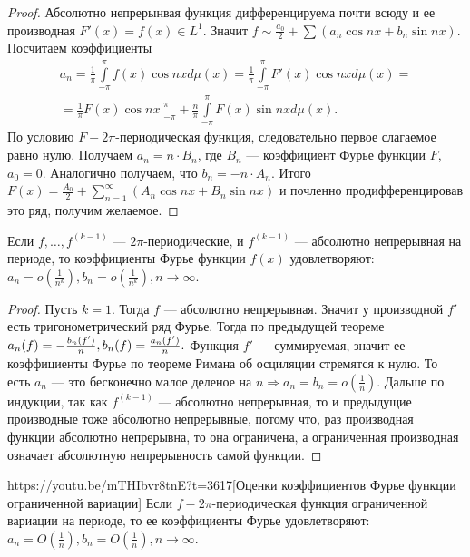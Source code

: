 \begin{proof}
	Абсолютно непрерынвая функция дифференцируема почти всюду и ее производная $F'(x)=f(x)\in L^1$. Значит $f\sim\frac{a_0}{2}+\sum\limits(a_n\cos nx+b_n\sin nx)$. Посчитаем коэффициенты 
	\begin{multline*}
		a_n=\frac{1}{\pi}\int\limits_{-\pi}^\pi f(x)\cos nx d\mu(x)=\frac{1}{\pi}\int\limits_{-\pi}^\pi F'(x)\cos nxd\mu(x) =\\=\frac{1}{\pi}F(x)\cos nx|_{-\pi}^\pi+\frac{n}{\pi}\int\limits_{-\pi}^\pi F(x)\sin nxd\mu(x).
	\end{multline*}
По условию $F-2\pi$-периодическая функция, следовательно первое слагаемое равно нулю. Получаем $a_n = n\cdot B_n$, где $B_n$ --- коэффициент Фурье функции $F$, $a_0 = 0$. Аналогично получаем, что $b_n=-n\cdot A_n$. Итого $F(x)=\frac{A_0}{2}+\sum\limits_{n=1}^\infty (A_n\cos nx + B_n\sin nx)$ и почленно продифференцировав это ряд, получим желаемое.
\end{proof}

\begin{corollary}
	Если $f,\ldots,f^{(k-1)}$ --- $2\pi$-периодические, и $f^{(k-1)}$ --- абсолютно непрерывная на периоде, то коэффициенты Фурье функции $f(x)$ удовлетворяют: ${a_n=o(\frac{1}{n^k}), b_n=o(\frac{1}{n^k}), n\to\infty}$.
\end{corollary}

\begin{proof}
	Пусть $k=1$. Тогда $f$ --- абсолютно непрерывная. Значит у производной $f'$ есть тригонометрический ряд Фурье. Тогда по предыдущей теореме $a_n(f)=-\frac{b_n(f')}{n},\\ b_n(f)=\frac{a_n(f')}{n}.$ Функция $f'$ --- суммируемая, значит ее коэффициенты Фурье по теореме Римана об осциляции стремятся к нулю. То есть $a_n$ --- это бесконечно малое деленое на $n\Rightarrow a_n=b_n=o(\frac{1}{n})$. Дальше по индукции, так как $f^{(k-1)}$ --- абсолютно непрерывная, то и предыдущие производные тоже абсолютно непрерывные, потому что, раз производная функции абсолютно непрерывна, то она ограничена, а ограниченная производная означает абсолютную непрерывность самой функции.
\end{proof}

\begin{linkthm}{https://youtu.be/mTHIbvr8tnE?t=3617}[Оценки коэффициентов Фурье функции ограниченной вариации]
	Если $f-2\pi$-периодическая функция ограниченной вариации на периоде, то ее коэффициенты Фурье удовлетворяют: $a_n=O\left(\frac{1}{n}\right), b_n=O\left(\frac{1}{n}\right), n\to\infty$.
\end{linkthm}

